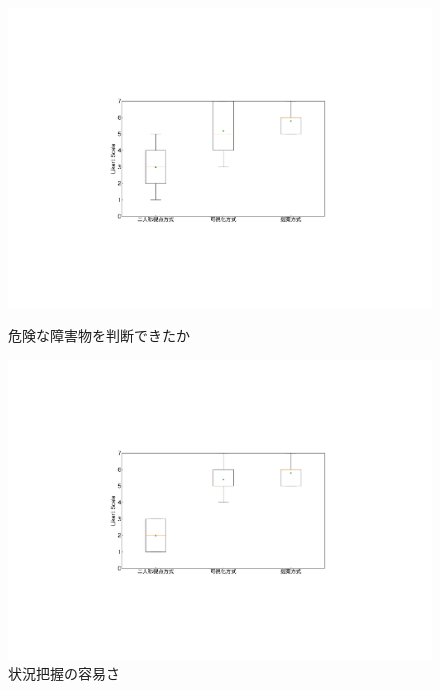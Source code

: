 \documentclass[a4paper,11pt]{ujreport}
\begin{document}
\begin{figure}[!b]
  \centering
  \begin{minipage}{0.45\linewidth}
    \centering
    \includegraphics[width=0.95\linewidth]{img/05_likert1.pdf}
    \caption{危険な障害物を判断できたか}
    \label{fig:05_likert1}
  \end{minipage}
  \begin{minipage}{0.45\linewidth}
    \centering
    \includegraphics[width=0.95\linewidth]{img/05_likert2.pdf}
    \caption{状況把握の容易さ}
    \label{fig:05_likert2}
  \end{minipage}
\end{figure}

\end{document}
